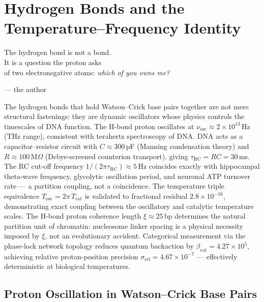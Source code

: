 
\chapter{Hydrogen Bonds and the Temperature--Frequency Identity}
\label{chap:hydrogen_bonds}

\epigraph{%
  The hydrogen bond is not a bond.\\
  It is a question the proton asks\\
  of two electronegative atoms: \emph{which of you owns me?}%
}{--- the author}

\begin{chapterbox}
The hydrogen bonds that hold Watson--Crick base pairs together are not mere
structural fastenings: they are dynamic oscillators whose physics controls
the timescales of DNA function. The H-bond proton oscillates at
$\nu_{\mathrm{osc}} \approx 2 \times 10^{13}$\,Hz (THz range), consistent
with terahertz spectroscopy of DNA. DNA acts as a capacitor--resistor circuit
with $C \approx 300$\,pF (Manning condensation theory) and
$R \approx 100$\,M$\Omega$ (Debye-screened counterion transport), giving
$\tau_{\mathrm{RC}} = RC = 30$\,ms. The RC cut-off frequency
$1/(2\pi\tau_{\mathrm{RC}}) \approx 5$\,Hz coincides exactly with hippocampal
theta-wave frequency, glycolytic oscillation period, and neuronal ATP turnover
rate --- a partition coupling, not a coincidence. The temperature triple
equivalence $T_{\mathrm{osc}} = 2\pi\,T_{\mathrm{cat}}$ is validated to
fractional residual $2.8 \times 10^{-16}$, demonstrating exact coupling between
the oscillatory and catalytic temperature scales. The H-bond proton coherence
length $\xi \approx 25$\,bp determines the natural partition unit of chromatin:
nucleosome linker spacing is a physical necessity imposed by $\xi$, not an
evolutionary accident. Categorical measurement via the phase-lock network
topology reduces quantum backaction by $\beta_{\mathrm{cat}} = 4.27 \times 10^5$,
achieving relative proton-position precision $\sigma_{\mathrm{rel}} = 4.67
\times 10^{-7}$ --- effectively deterministic at biological temperatures.
\end{chapterbox}

\section{Proton Oscillation in Watson--Crick Base Pairs}
\label{sec:proton_oscillation}

